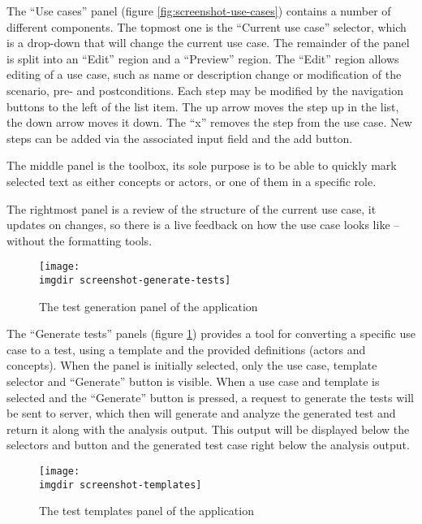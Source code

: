 \noindent The ``Use cases'' panel (figure \ref{fig:screenshot-use-cases}) contains a number of different components. The topmost one is the ``Current use case'' selector, which is a drop-down that will change the current use case. The remainder of the panel is split into an ``Edit'' region and a ``Preview'' region. The ``Edit'' region allows editing of a use case, such as name or description change or modification of the scenario, pre- and postconditions. Each step may be modified by the navigation buttons to the left of the list item. The up arrow moves the step up in the list, the down arrow moves it down. The ``x'' removes the step from the use case. New steps can be added via the associated input field and the add button. \medskip 

\noindent The middle panel is the toolbox, its sole purpose is to be able to quickly mark selected text as either concepts or actors, or one of them in a specific role.\medskip

\noindent The rightmost panel is a review of the structure of the current use case, it updates on changes, so there is a live feedback on how the use case looks like -- without the formatting tools.\medskip

\begin{figure}[!htbp]
  \centering
  \texttt{[image: \\imgdir screenshot-generate-tests]}
  \caption{The test generation panel of the application}
\label{fig:screenshot-screenshot-generate-tests}
\end{figure}

\noindent The ``Generate tests'' panels (figure \ref{fig:screenshot-screenshot-generate-tests}) provides a tool for converting a specific use case to a test, using a template and the provided definitions (actors and concepts). When the panel is initially selected, only the use case, template selector and ``Generate'' button is visible. When a use case and template is selected and the ``Generate''  button is pressed, a request to generate the tests will be sent to server, which then will generate and analyze the generated test and return it along with the analysis output. This output will be displayed below the selectors and button and the generated test case right below the analysis output.\medskip

\begin{figure}[!htbp]
  \centering
  \texttt{[image: \\imgdir screenshot-templates]}
  \caption{The test templates panel of the application}
\label{fig:screenshot-templates}
\end{figure}

